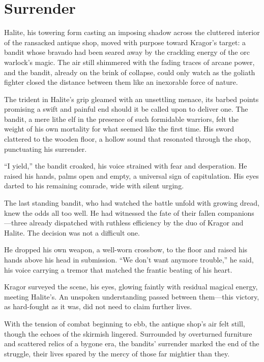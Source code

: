 \documentclass[
  letterpaper,12pt,twoside,twocolumn,openany,
  nodeprecatedcode,bg=full]{dndbook}
\begin{document}
\section{Surrender}\label{surrender}

Halite, his towering form casting an imposing shadow across the
cluttered interior of the ransacked antique shop, moved with purpose
toward Kragor's target: a bandit whose bravado had been seared away by
the crackling energy of the orc warlock's magic. The air still shimmered
with the fading traces of arcane power, and the bandit, already on the
brink of collapse, could only watch as the goliath fighter closed the
distance between them like an inexorable force of nature.

The trident in Halite's grip gleamed with an unsettling menace, its
barbed points promising a swift and painful end should it be called upon
to deliver one. The bandit, a mere lithe elf in the presence of such
formidable warriors, felt the weight of his own mortality for what
seemed like the first time. His sword clattered to the wooden floor, a
hollow sound that resonated through the shop, punctuating his surrender.

``I yield,'' the bandit croaked, his voice strained with fear and
desperation. He raised his hands, palms open and empty, a universal sign
of capitulation. His eyes darted to his remaining comrade, wide with
silent urging.

The last standing bandit, who had watched the battle unfold with growing
dread, knew the odds all too well. He had witnessed the fate of their
fallen companions---three already dispatched with ruthless efficiency by
the duo of Kragor and Halite. The decision was not a difficult one.

He dropped his own weapon, a well-worn crossbow, to the floor and raised
his hands above his head in submission. ``We don't want anymore
trouble,'' he said, his voice carrying a tremor that matched the frantic
beating of his heart.

Kragor surveyed the scene, his eyes, glowing faintly with residual
magical energy, meeting Halite's. An unspoken understanding passed
between them---this victory, as hard-fought as it was, did not need to
claim further lives.

With the tension of combat beginning to ebb, the antique shop's air felt
still, though the echoes of the skirmish lingered. Surrounded by
overturned furniture and scattered relics of a bygone era, the bandits'
surrender marked the end of the struggle, their lives spared by the
mercy of those far mightier than they.
\end{document}
